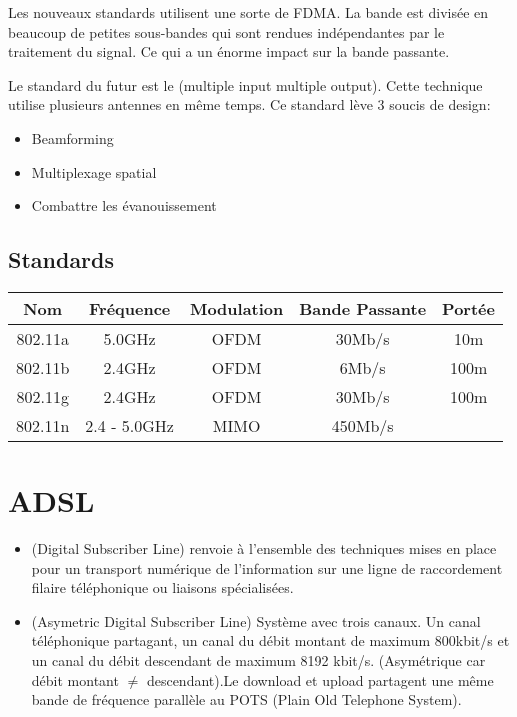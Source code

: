 Les nouveaux standards  utilisent une sorte de FDMA. La bande est divisée en beaucoup de petites sous-bandes qui sont rendues indépendantes par le traitement du signal. Ce qui a un énorme impact sur la bande passante.

Le standard du futur est le  (multiple input multiple output). Cette technique utilise plusieurs antennes en même temps. Ce standard lève 3 soucis de design:
\begin{itemize}
\item Beamforming
\item Multiplexage spatial
\item Combattre les évanouissement
\end{itemize}

\section{Standards}
\begin{center}
\begin{tabular}{ccccc}
Nom & Fréquence & Modulation & Bande Passante & Portée\\
\hline
802.11a & 5.0GHz & OFDM & 30Mb/s & 10m\\
802.11b & 2.4GHz & OFDM & 6Mb/s & 100m\\
802.11g & 2.4GHz & OFDM & 30Mb/s & 100m\\
802.11n & 2.4 - 5.0GHz& MIMO & 450Mb/s & \\
\hline
\end{tabular}
\end{center}

\chapter{ADSL}

\begin{itemize}
\item {} (Digital Subscriber Line) renvoie à l'ensemble des techniques mises en place pour un transport numérique de l'information sur une ligne de raccordement filaire téléphonique ou liaisons spécialisées.

\item {} (Asymetric Digital Subscriber Line) Système avec trois canaux. Un canal téléphonique partagant, un canal du débit montant de maximum 800kbit/s et un canal du débit descendant de maximum 8192 kbit/s. (Asymétrique car débit montant $\neq$ descendant).Le download et upload partagent une même bande de fréquence parallèle au POTS (Plain Old Telephone System).
\end{itemize}

